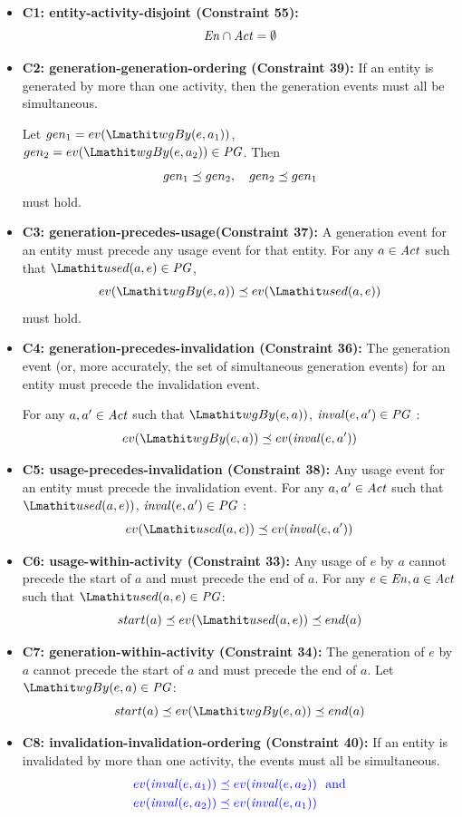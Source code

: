 \begin{itemize}
	
	\item\textbf{C1: entity-activity-disjoint (Constraint 55):} \[\mathit{En} \cap \mathit{Act} = \emptyset\]
	
	\item\textbf{C2: generation-generation-ordering (Constraint 39):}  If an entity is generated by more than one activity, then the generation events must all be simultaneous.
	
	Let 
	$gen_1 = ev(\wgby(e, a_1))$, $gen_2 = ev(\wgby(e, a_2)) \in \pg$. Then  \[gen_1  \preceq  gen_2, \quad gen_2 \preceq gen_1\] must hold.
	
	\item\textbf{C3: generation-precedes-usage(Constraint 37):} A generation event for an entity must precede any usage event for that entity.
	For any $a \in \mathit{Act}$ such that $\used(a,e) \in \pg$, \[	ev(\wgby(e, a)) \preorder ev(\used(a,e))\] must hold.
	
	\item\textbf{C4: generation-precedes-invalidation (Constraint 36):} The generation event (or, more accurately, the set of simultaneous generation events) for an entity must precede the invalidation event.
	
	For any $a,a' \in \mathit{Act}$ such that $\wgby(e, a))$, $\mathit{inval}(e,a') \in \mathit{PG}$ :
	\[ ev(\wgby(e, a)) \preorder ev(\inv(e,a')) \]
	
	\item\textbf{C5: usage-precedes-invalidation (Constraint 38):} Any usage event for an entity must precede the invalidation event.
%	
	For any $a,a' \in \mathit{Act}$ such that $\used(a,e))$, $\mathit{inval}(e,a') \in \mathit{PG}$ :
	\[ ev(\used(a,e)) \preorder ev(\inv(e,a')) \]
	
	\item\textbf{C6: usage-within-activity (Constraint 33):} Any usage of $e$ by $a$ cannot precede the start of $a$ and must precede the end of $a$. For any $e\in \mathit{En}, a \in \mathit{Act}$ such that $\used(a,e) \in \pg$:
	\[start(a) \preorder ev(\used(a,e))   \preorder end(a)\]
	
	\item\textbf{C7: generation-within-activity (Constraint 34):} The generation of $e$ by $a$ cannot precede the start of $a$ and must precede the end of $a$.
	Let $\wgby(e,a) \in \pg$:
	\[ start(a) \preorder ev(\wgby(e,a))  \preorder end(a)\]
	
	\item\textbf{C8: invalidation-invalidation-ordering (Constraint 40):}	If an entity is invalidated by more than one activity, the events must all be simultaneous. 
	  \begin{align*}
          &\jwbtwo{ev(\inv(e,a_1)) \preorder  ev(\inv(e,a_2)) ~~\mathrm{and}} \\
          &\jwbtwo{ev(\inv(e,a_2)) \preorder  ev(\inv(e,a_1))}
          \end{align*}

\end{itemize}

